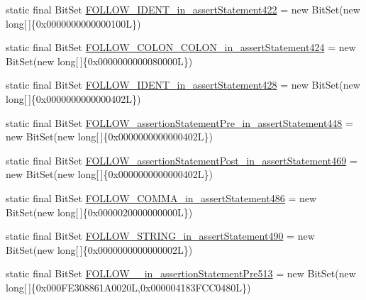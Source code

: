 \begin{DoxyCompactItemize}
static final Bit\-Set \hyperlink{classorg_1_1tzi_1_1use_1_1parser_1_1testsuite_1_1_test_suite_parser_ac67bbc0ddbb2fab1adabd2469a0f092a}{F\-O\-L\-L\-O\-W\-\_\-\-I\-D\-E\-N\-T\-\_\-in\-\_\-assert\-Statement422} = new Bit\-Set(new long\mbox{[}$\,$\mbox{]}\{0x0000000000000100\-L\})
\item 
static final Bit\-Set \hyperlink{classorg_1_1tzi_1_1use_1_1parser_1_1testsuite_1_1_test_suite_parser_a503482f71e7caf02a3e4506f77e5a420}{F\-O\-L\-L\-O\-W\-\_\-\-C\-O\-L\-O\-N\-\_\-\-C\-O\-L\-O\-N\-\_\-in\-\_\-assert\-Statement424} = new Bit\-Set(new long\mbox{[}$\,$\mbox{]}\{0x0000000000080000\-L\})
\item 
static final Bit\-Set \hyperlink{classorg_1_1tzi_1_1use_1_1parser_1_1testsuite_1_1_test_suite_parser_a627e2970e7924322878621bc9af9ef52}{F\-O\-L\-L\-O\-W\-\_\-\-I\-D\-E\-N\-T\-\_\-in\-\_\-assert\-Statement428} = new Bit\-Set(new long\mbox{[}$\,$\mbox{]}\{0x0000000000000402\-L\})
\item 
static final Bit\-Set \hyperlink{classorg_1_1tzi_1_1use_1_1parser_1_1testsuite_1_1_test_suite_parser_ad6fd2be22cc1c79f4f9c34701311feba}{F\-O\-L\-L\-O\-W\-\_\-assertion\-Statement\-Pre\-\_\-in\-\_\-assert\-Statement448} = new Bit\-Set(new long\mbox{[}$\,$\mbox{]}\{0x0000000000000402\-L\})
\item 
static final Bit\-Set \hyperlink{classorg_1_1tzi_1_1use_1_1parser_1_1testsuite_1_1_test_suite_parser_a94cf5b19a451d967538cf4403b042a6c}{F\-O\-L\-L\-O\-W\-\_\-assertion\-Statement\-Post\-\_\-in\-\_\-assert\-Statement469} = new Bit\-Set(new long\mbox{[}$\,$\mbox{]}\{0x0000000000000402\-L\})
\item 
static final Bit\-Set \hyperlink{classorg_1_1tzi_1_1use_1_1parser_1_1testsuite_1_1_test_suite_parser_a9dd9c238df5b82ec7c7c60eaefcbdcd0}{F\-O\-L\-L\-O\-W\-\_\-\-C\-O\-M\-M\-A\-\_\-in\-\_\-assert\-Statement486} = new Bit\-Set(new long\mbox{[}$\,$\mbox{]}\{0x0000020000000000\-L\})
\item 
static final Bit\-Set \hyperlink{classorg_1_1tzi_1_1use_1_1parser_1_1testsuite_1_1_test_suite_parser_ab3eb24f7b55a5dbaf89cd10c25cce593}{F\-O\-L\-L\-O\-W\-\_\-\-S\-T\-R\-I\-N\-G\-\_\-in\-\_\-assert\-Statement490} = new Bit\-Set(new long\mbox{[}$\,$\mbox{]}\{0x0000000000000002\-L\})
\item 
static final Bit\-Set \hyperlink{classorg_1_1tzi_1_1use_1_1parser_1_1testsuite_1_1_test_suite_parser_adcef42ef03e8fe06f8f2c2bc653f3c9a}{F\-O\-L\-L\-O\-W\-\_\-\_\-in\-\_\-assertion\-Statement\-Pre513} = new Bit\-Set(new long\mbox{[}$\,$\mbox{]}\{0x000\-F\-E308861\-A0020\-L,0x000004183\-F\-C\-C0480\-L\})

\end{DoxyCompactItemize}
